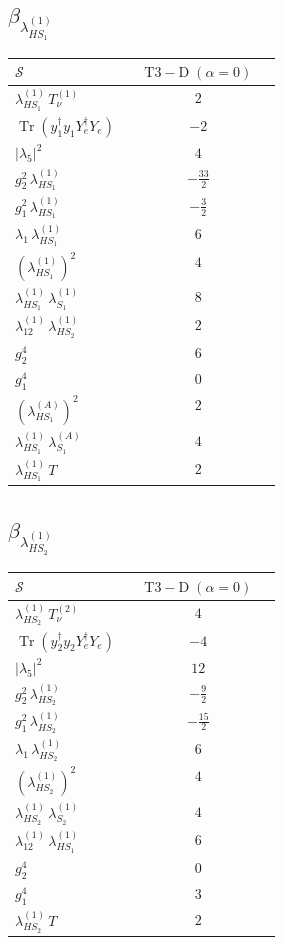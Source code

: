 \documentclass[9pt]{article}
\begin{document}
\subsection*{$ \beta_{\lambda_{HS_1}^{(1)}} $}
\begin{longtable}{@{}p{0.31\linewidth}c@{}}
\toprule
$\mathcal{S}$ & $ \mathrm{T3-D}\;(\alpha=0) $ \\
\midrule
$ \lambda_{HS_1}^{(1)}\,T_{\nu}^{(1)} $ & $ 2 $ \\
$ \operatorname{Tr}(y_1^\dagger y_1Y_e^\dagger Y_e) $ & $ -2 $ \\
$ |\lambda_5|^2 $ & $ 4 $ \\
$ g_2^2\,\lambda_{HS_1}^{(1)} $ & $ - \frac{33}{2} $ \\
$ g_1^2\,\lambda_{HS_1}^{(1)} $ & $ - \frac{3}{2} $ \\
$ \lambda_1\,\lambda_{HS_1}^{(1)} $ & $ 6 $ \\
$ \left(\lambda_{HS_1}^{(1)}\right)^2 $ & $ 4 $ \\
$ \lambda_{HS_1}^{(1)}\,\lambda_{S_1}^{(1)} $ & $ 8 $ \\
$ \lambda_{12}^{(1)}\,\lambda_{HS_2}^{(1)} $ & $ 2 $ \\
$ g_2^4 $ & $ 6 $ \\
$ g_1^4 $ & $ 0 $ \\
$ \left(\lambda_{HS_1}^{(A)}\right)^2 $ & $ 2 $ \\
$ \lambda_{HS_1}^{(1)}\,\lambda_{S_1}^{(A)} $ & $ 4 $ \\
$ \lambda_{HS_1}^{(1)}\,T $ & $ 2 $ \\
\bottomrule
\end{longtable}
\subsection*{$ \beta_{\lambda_{HS_2}^{(1)}} $}
\begin{longtable}{@{}p{0.31\linewidth}c@{}}
\toprule
$\mathcal{S}$ & $ \mathrm{T3-D}\;(\alpha=0) $ \\
\midrule
$ \lambda_{HS_2}^{(1)}\,T_{\nu}^{(2)} $ & $ 4 $ \\
$ \operatorname{Tr}(y_2^\dagger y_2Y_e^\dagger Y_e) $ & $ -4 $ \\
$ |\lambda_5|^2 $ & $ 12 $ \\
$ g_2^2\,\lambda_{HS_2}^{(1)} $ & $ - \frac{9}{2} $ \\
$ g_1^2\,\lambda_{HS_2}^{(1)} $ & $ - \frac{15}{2} $ \\
$ \lambda_1\,\lambda_{HS_2}^{(1)} $ & $ 6 $ \\
$ \left(\lambda_{HS_2}^{(1)}\right)^2 $ & $ 4 $ \\
$ \lambda_{HS_2}^{(1)}\,\lambda_{S_2}^{(1)} $ & $ 4 $ \\
$ \lambda_{12}^{(1)}\,\lambda_{HS_1}^{(1)} $ & $ 6 $ \\
$ g_2^4 $ & $ 0 $ \\
$ g_1^4 $ & $ 3 $ \\
$ \lambda_{HS_2}^{(1)}\,T $ & $ 2 $ \\
\bottomrule
\end{longtable}
\end{document}
